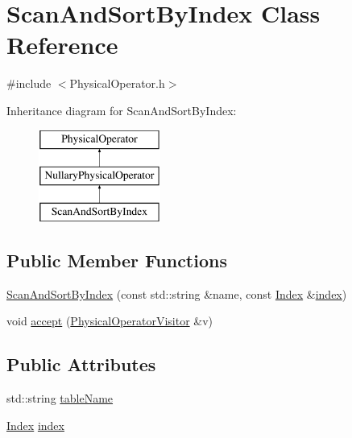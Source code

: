 \hypertarget{class_scan_and_sort_by_index}{\section{Scan\+And\+Sort\+By\+Index Class Reference}
\label{class_scan_and_sort_by_index}
}


{\ttfamily \#include $<$Physical\+Operator.\+h$>$}

Inheritance diagram for Scan\+And\+Sort\+By\+Index\+:\begin{figure}[H]
\begin{center}
\leavevmode
\includegraphics[height=3.000000cm]{class_scan_and_sort_by_index}
\end{center}
\end{figure}
\subsection*{Public Member Functions}
\begin{DoxyCompactItemize}
\item 
\hyperlink{class_scan_and_sort_by_index_a8304f98fd2eea171365ad996666fdd01}{Scan\+And\+Sort\+By\+Index} (const std\+::string \&name, const \hyperlink{class_index}{Index} \&\hyperlink{class_scan_and_sort_by_index_a132a795383838f5cc3e6c17288509e15}{index})
\item 
void \hyperlink{class_scan_and_sort_by_index_a9e0d99d88104c8215bacb470e298b363}{accept} (\hyperlink{class_physical_operator_visitor}{Physical\+Operator\+Visitor} \&v)
\end{DoxyCompactItemize}
\subsection*{Public Attributes}
\begin{DoxyCompactItemize}
\item 
std\+::string \hyperlink{class_scan_and_sort_by_index_a04ad43495fcb141d4e7c51d9907f3a42}{table\+Name}
\item 
\hyperlink{class_index}{Index} \hyperlink{class_scan_and_sort_by_index_a132a795383838f5cc3e6c17288509e15}{index}
\end{DoxyCompactItemize}


